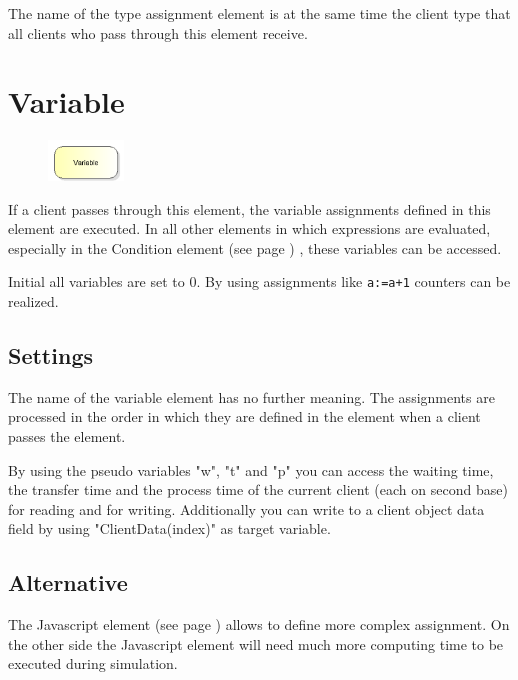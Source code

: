 The name of the type assignment element is at the same time the client type that all clients who pass through this element receive.


\section{Variable}
\label{ref:ModelElementSet}

\begin{figure}
\vspace{-22pt}
\includegraphics[width=2cm]{imageModelElementSet.png}
\vspace{-22pt}
\end{figure}

If a client passes through this element, the variable assignments defined in
this element are executed. In all other elements in which expressions are evaluated,
especially in the Condition element (see page \pageref{ref:ModelElementHold}) , these variables can be accessed.

Initial all variables are set to 0. By using assignments like \texttt{a:=a+1} counters can be realized.

\subsection*{Settings}

The name of the variable element has no further meaning.
The assignments are processed in the order in which they are defined in the element when a client passes the element.

By using the pseudo variables "w", "t" and "p" you can access the waiting time, the transfer time and the
process time of the current client (each on second base) for reading and for writing. Additionally you can
write to a client object data field by using "ClientData(index)" as target variable.

\subsection*{Alternative}

The Javascript element (see page \pageref{ref:ModelElementSetJS}) allows to define more complex assignment.
On the other side the Javascript element will need much more computing time to be executed during simulation.





